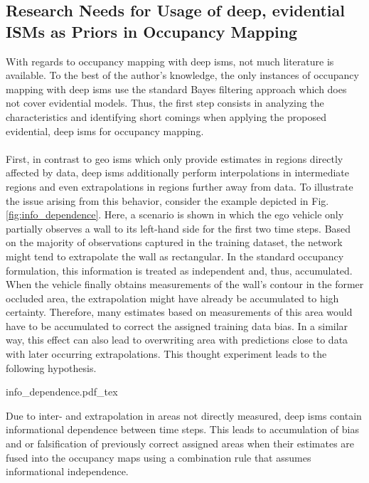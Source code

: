 \subsection{Research Needs for Usage of deep, evidential ISMs as Priors in Occupancy Mapping}
\label{subsec:research_needs_for_usage_of_deep_ims_as_priors_in_occmapping}
With regards to occupancy mapping with deep \gls{ism}s, not much literature is available. To the best of the author's knowledge, the only instances of occupancy mapping with deep \gls{ism}s use the standard Bayes filtering approach which does not cover evidential models. Thus, the first step consists in analyzing the characteristics and identifying short comings when applying the proposed evidential, deep \gls{ism}s for occupancy mapping.
\\\\
First, in contrast to geo \gls{ism}s which only provide estimates in regions directly affected by data, deep \gls{ism}s additionally perform interpolations in intermediate regions and even extrapolations in regions further away from data. To illustrate the issue arising from this behavior, consider the example depicted in Fig. \ref{fig:info_dependence}. Here, a scenario is shown in which the ego vehicle only partially observes a wall to its left-hand side for the first two time steps. Based on the majority of observations captured in the training dataset, the network might tend to extrapolate the wall as rectangular. In the standard occupancy formulation, this information is treated as independent and, thus, accumulated. When the vehicle finally obtains measurements of the wall's contour in the former occluded area, the extrapolation might have already be accumulated to high certainty. Therefore, many estimates based on measurements of this area would have to be accumulated to correct the assigned training data bias. In a similar way, this effect can also lead to overwriting area with predictions close to data with later occurring extrapolations. This thought experiment leads to the following hypothesis.
\begin{center}
	{info_dependence.pdf_tex}
\end{center}
\begin{hyp} \label{hyp:temporal_dependence}
	Due to inter- and extrapolation in areas not directly measured, deep \gls{ism}s contain informational dependence between time steps. This leads to accumulation of bias and or falsification of previously correct assigned areas when their estimates are fused into the occupancy maps using a combination rule that assumes informational independence.  
\end{hyp}
